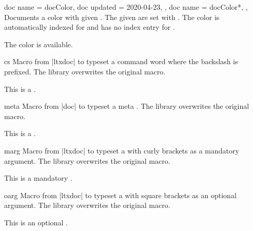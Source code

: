 \begin{docCommands}[doc parameter=\oarg{options}\marg{name}]
  {
    {
      doc name    = docColor,
      doc updated = 2020-04-23,
    },
    {
      doc name = docColor*,
    },
  }
  Documents a color with given .
  The given  are set with .
  The color is automatically indexed for 
  and has no index entry for .
\begin{dispExample}
The color  is available.
\end{dispExample}
\end{docCommands}



\begin{docCommand}{cs}{}
  Macro from |ltxdoc| \cite{carlisle:ltxdoc} to typeset a command word 
  where the backslash is prefixed. The library overwrites the original macro.
\begin{dispExample}
This is a .
\end{dispExample}
\end{docCommand}

\begin{docCommand}{meta}{}
  Macro from |doc| \cite{mittelbach:doc} to typeset a meta .
  The library overwrites the original macro.
\begin{dispExample}
This is a .
\end{dispExample}
\end{docCommand}


\begin{docCommand}{marg}{}
  Macro from |ltxdoc| \cite{carlisle:ltxdoc} to typeset a  with
  curly brackets as a mandatory argument. The library overwrites the original macro.
\begin{dispExample}
This is a mandatory .
\end{dispExample}
\end{docCommand}

\begin{docCommand}{oarg}{}
  Macro from |ltxdoc| \cite{carlisle:ltxdoc} to typeset a  with
  square brackets as an optional argument. The library overwrites the original macro.
\begin{dispExample}
This is an optional .
\end{dispExample}
\end{docCommand}

